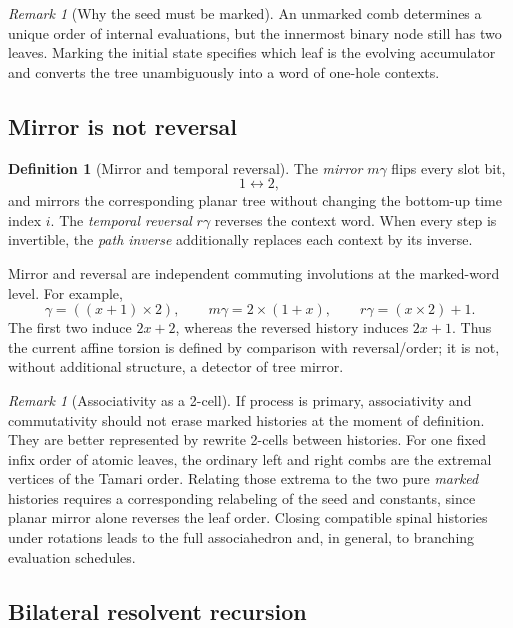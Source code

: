 \documentclass[11pt]{article}
\theoremstyle{definition}
\newtheorem{definition}[theorem]{Definition}
\theoremstyle{remark}
\newtheorem{remark}[theorem]{Remark}
\begin{document}
\begin{remark}[Why the seed must be marked]
An unmarked comb determines a unique order of internal evaluations, but the
innermost binary node still has two leaves.  Marking the initial state specifies
which leaf is the evolving accumulator and converts the tree unambiguously
into a word of one-hole contexts.
\end{remark}

\subsection{Mirror is not reversal}

\begin{definition}[Mirror and temporal reversal]
The \emph{mirror} \(m\gamma\) flips every slot bit,
\[
1\longleftrightarrow 2,
\]
and mirrors the corresponding planar tree without changing the bottom-up time
index \(i\).  The \emph{temporal reversal} \(r\gamma\) reverses the context word.
When every step is invertible, the \emph{path inverse} additionally replaces
each context by its inverse.
\end{definition}

Mirror and reversal are independent commuting involutions at the marked-word
level.  For example,
\[
\gamma=((x+1)\times 2),\qquad
m\gamma=2\times(1+x),\qquad
r\gamma=(x\times2)+1.
\]
The first two induce \(2x+2\), whereas the reversed history induces \(2x+1\).
Thus the current affine torsion is defined by comparison with reversal/order;
it is not, without additional structure, a detector of tree mirror.

\begin{remark}[Associativity as a 2-cell]
If process is primary, associativity and commutativity should not erase marked
histories at the moment of definition.  They are better represented by
rewrite 2-cells between histories.  For one fixed infix order of atomic
leaves, the ordinary left and right combs are the extremal vertices of the
Tamari order.  Relating those extrema to the two pure \emph{marked} histories
requires a corresponding relabeling of the seed and constants, since planar
mirror alone reverses the leaf order.  Closing compatible spinal histories
under rotations leads to the full associahedron and, in general, to branching
evaluation schedules.
\end{remark}

\subsection{Bilateral resolvent recursion}
\end{document}
